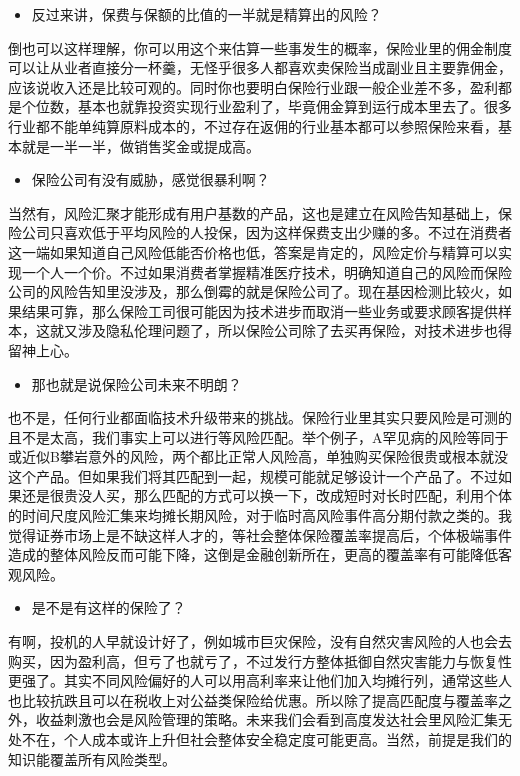 \documentclass[
  letterpaper,
  DIV=11,
  numbers=noendperiod]{scrreprt}
\providecommand{\tightlist}{%
  \setlength{\itemsep}{0pt}\setlength{\parskip}{0pt}}\usepackage{longtable,booktabs,array}
\begin{document}
\begin{itemize}
\tightlist
\item
  反过来讲，保费与保额的比值的一半就是精算出的风险？
\end{itemize}

倒也可以这样理解，你可以用这个来估算一些事发生的概率，保险业里的佣金制度可以让从业者直接分一杯羹，无怪乎很多人都喜欢卖保险当成副业且主要靠佣金，应该说收入还是比较可观的。同时你也要明白保险行业跟一般企业差不多，盈利都是个位数，基本也就靠投资实现行业盈利了，毕竟佣金算到运行成本里去了。很多行业都不能单纯算原料成本的，不过存在返佣的行业基本都可以参照保险来看，基本就是一半一半，做销售奖金或提成高。

\begin{itemize}
\tightlist
\item
  保险公司有没有威胁，感觉很暴利啊？
\end{itemize}

当然有，风险汇聚才能形成有用户基数的产品，这也是建立在风险告知基础上，保险公司只喜欢低于平均风险的人投保，因为这样保费支出少赚的多。不过在消费者这一端如果知道自己风险低能否价格也低，答案是肯定的，风险定价与精算可以实现一个人一个价。不过如果消费者掌握精准医疗技术，明确知道自己的风险而保险公司的风险告知里没涉及，那么倒霉的就是保险公司了。现在基因检测比较火，如果结果可靠，那么保险工司很可能因为技术进步而取消一些业务或要求顾客提供样本，这就又涉及隐私伦理问题了，所以保险公司除了去买再保险，对技术进步也得留神上心。

\begin{itemize}
\tightlist
\item
  那也就是说保险公司未来不明朗？
\end{itemize}

也不是，任何行业都面临技术升级带来的挑战。保险行业里其实只要风险是可测的且不是太高，我们事实上可以进行等风险匹配。举个例子，A罕见病的风险等同于或近似B攀岩意外的风险，两个都比正常人风险高，单独购买保险很贵或根本就没这个产品。但如果我们将其匹配到一起，规模可能就足够设计一个产品了。不过如果还是很贵没人买，那么匹配的方式可以换一下，改成短时对长时匹配，利用个体的时间尺度风险汇集来均摊长期风险，对于临时高风险事件高分期付款之类的。我觉得证券市场上是不缺这样人才的，等社会整体保险覆盖率提高后，个体极端事件造成的整体风险反而可能下降，这倒是金融创新所在，更高的覆盖率有可能降低客观风险。

\begin{itemize}
\tightlist
\item
  是不是有这样的保险了？
\end{itemize}

有啊，投机的人早就设计好了，例如城市巨灾保险，没有自然灾害风险的人也会去购买，因为盈利高，但亏了也就亏了，不过发行方整体抵御自然灾害能力与恢复性更强了。其实不同风险偏好的人可以用高利率来让他们加入均摊行列，通常这些人也比较抗跌且可以在税收上对公益类保险给优惠。所以除了提高匹配度与覆盖率之外，收益刺激也会是风险管理的策略。未来我们会看到高度发达社会里风险汇集无处不在，个人成本或许上升但社会整体安全稳定度可能更高。当然，前提是我们的知识能覆盖所有风险类型。
\end{document}
